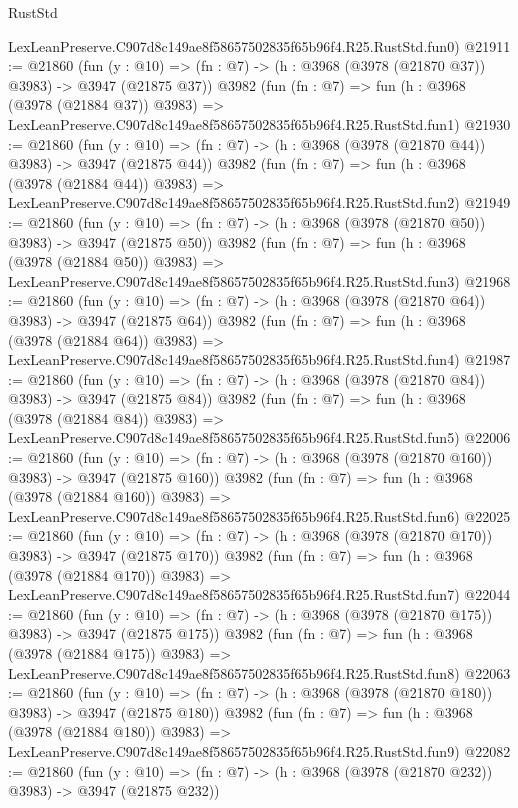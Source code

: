 \begin{lexlean}{RustStd}
\begin{coremodule}
    LexLeanPreserve.C907d8c149ae8f58657502835f65b96f4.R25.RustStd.fun0)
@21911 := @21860
    (fun (y : @10) => (fn : @7) -> (h : @3968 (@3978 (@21870 @37)) @3983) -> @3947 (@21875 @37))
    @3982
    (fun (fn : @7) =>
    fun (h : @3968 (@3978 (@21884 @37)) @3983) =>
    LexLeanPreserve.C907d8c149ae8f58657502835f65b96f4.R25.RustStd.fun1)
@21930 := @21860
    (fun (y : @10) => (fn : @7) -> (h : @3968 (@3978 (@21870 @44)) @3983) -> @3947 (@21875 @44))
    @3982
    (fun (fn : @7) =>
    fun (h : @3968 (@3978 (@21884 @44)) @3983) =>
    LexLeanPreserve.C907d8c149ae8f58657502835f65b96f4.R25.RustStd.fun2)
@21949 := @21860
    (fun (y : @10) => (fn : @7) -> (h : @3968 (@3978 (@21870 @50)) @3983) -> @3947 (@21875 @50))
    @3982
    (fun (fn : @7) =>
    fun (h : @3968 (@3978 (@21884 @50)) @3983) =>
    LexLeanPreserve.C907d8c149ae8f58657502835f65b96f4.R25.RustStd.fun3)
@21968 := @21860
    (fun (y : @10) => (fn : @7) -> (h : @3968 (@3978 (@21870 @64)) @3983) -> @3947 (@21875 @64))
    @3982
    (fun (fn : @7) =>
    fun (h : @3968 (@3978 (@21884 @64)) @3983) =>
    LexLeanPreserve.C907d8c149ae8f58657502835f65b96f4.R25.RustStd.fun4)
@21987 := @21860
    (fun (y : @10) => (fn : @7) -> (h : @3968 (@3978 (@21870 @84)) @3983) -> @3947 (@21875 @84))
    @3982
    (fun (fn : @7) =>
    fun (h : @3968 (@3978 (@21884 @84)) @3983) =>
    LexLeanPreserve.C907d8c149ae8f58657502835f65b96f4.R25.RustStd.fun5)
@22006 := @21860
    (fun (y : @10) => (fn : @7) -> (h : @3968 (@3978 (@21870 @160)) @3983) -> @3947 (@21875 @160))
    @3982
    (fun (fn : @7) =>
    fun (h : @3968 (@3978 (@21884 @160)) @3983) =>
    LexLeanPreserve.C907d8c149ae8f58657502835f65b96f4.R25.RustStd.fun6)
@22025 := @21860
    (fun (y : @10) => (fn : @7) -> (h : @3968 (@3978 (@21870 @170)) @3983) -> @3947 (@21875 @170))
    @3982
    (fun (fn : @7) =>
    fun (h : @3968 (@3978 (@21884 @170)) @3983) =>
    LexLeanPreserve.C907d8c149ae8f58657502835f65b96f4.R25.RustStd.fun7)
@22044 := @21860
    (fun (y : @10) => (fn : @7) -> (h : @3968 (@3978 (@21870 @175)) @3983) -> @3947 (@21875 @175))
    @3982
    (fun (fn : @7) =>
    fun (h : @3968 (@3978 (@21884 @175)) @3983) =>
    LexLeanPreserve.C907d8c149ae8f58657502835f65b96f4.R25.RustStd.fun8)
@22063 := @21860
    (fun (y : @10) => (fn : @7) -> (h : @3968 (@3978 (@21870 @180)) @3983) -> @3947 (@21875 @180))
    @3982
    (fun (fn : @7) =>
    fun (h : @3968 (@3978 (@21884 @180)) @3983) =>
    LexLeanPreserve.C907d8c149ae8f58657502835f65b96f4.R25.RustStd.fun9)
@22082 := @21860
    (fun (y : @10) => (fn : @7) -> (h : @3968 (@3978 (@21870 @232)) @3983) -> @3947 (@21875 @232))

\end{coremodule}
\end{lexlean}
